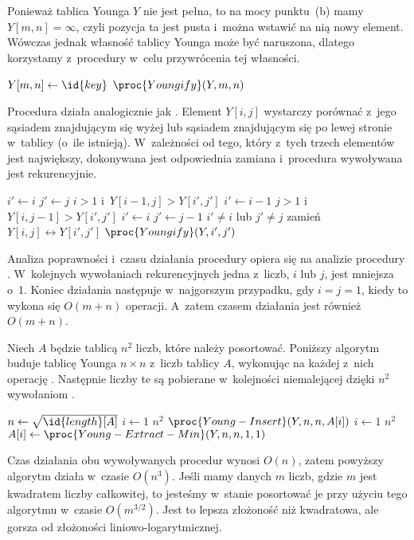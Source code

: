 \subproblem %
Ponieważ tablica Younga $Y$ nie jest pełna, to na mocy punktu~(b) mamy $Y[m,n]=\infty$, czyli pozycja ta jest pusta i~można wstawić na nią nowy element. Wówczas jednak własność tablicy Younga może być naruszona, dlatego korzystamy z~procedury  w~celu przywrócenia tej własności.
\begin{codebox}
\li	$Y[m,n]\gets\id{key}$
\li	$\proc{Youngify}(Y,m,n)$
\end{codebox}

Procedura  działa analogicznie jak . Element $Y[i,j]$ wystarczy porównać z~jego sąsiadem znajdującym się wyżej lub sąsiadem znajdującym się po lewej stronie w~tablicy (o~ile istnieją). W~zależności od tego, który z~tych trzech elementów jest największy, dokonywana jest odpowiednia zamiana i~procedura wywoływana jest rekurencyjnie.
\begin{codebox}
\li	$i'\gets i$
\li	$j'\gets j$
\li	\If $i>1$ i~$Y[i-1,j]>Y[i',j']$
\li		\Then $i'\gets i-1$
		\End
\li	\If $j>1$ i~$Y[i,j-1]>Y[i',j']$
\li		\Then
			$i'\gets i$
\li			$j'\gets j-1$
		\End
\li	\If $i'\ne i$ lub $j'\ne j$
\li		\Then
			zamień $Y[i,j]\leftrightarrow Y[i',j']$
\li			$\proc{Youngify}(Y,i',j')$
		\End
\end{codebox}

Analiza poprawności i~czasu działania procedury  opiera się na analizie procedury . W~kolejnych wywołaniach rekurencyjnych jedna z~liczb, $i$ lub $j$, jest mniejsza o~1. Koniec działania następuje w~najgorszym przypadku, gdy $i=j=1$, kiedy to wykona się $O(m+n)$ operacji. A~zatem czasem działania  jest również $O(m+n)$.

\subproblem %
Niech $A$ będzie tablicą $n^2$ liczb, które należy posortować. Poniższy algorytm buduje tablicę Younga $n\times n$ z~liczb tablicy $A$, wykonując na każdej z~nich operację . Następnie liczby te są pobierane w~kolejności niemalejącej dzięki $n^2$ wywołaniom .
\begin{codebox}
\li	$n\gets\sqrt{\id{length}[A]}$
\li	\For $i\gets1$ \To $n^2$
\li		\Do $\proc{Young-Insert}(Y,n,n,A[i])$
		\End
\li	\For $i\gets1$ \To $n^2$
\li		\Do $A[i]\gets\proc{Young-Extract-Min}(Y,n,n,1,1)$
		\End
\end{codebox}

Czas działania obu wywoływanych procedur wynosi $O(n)$, zatem powyższy algorytm działa w~czasie $O(n^3)$. Jeśli mamy danych $m$ liczb, gdzie $m$ jest kwadratem liczby całkowitej, to jesteśmy w~stanie posortować je przy użyciu tego algorytmu w~czasie $O(m^{3/2})$. Jest to lepsza złożoność niż kwadratowa, ale gorsza od złożoności liniowo-logarytmicznej.

